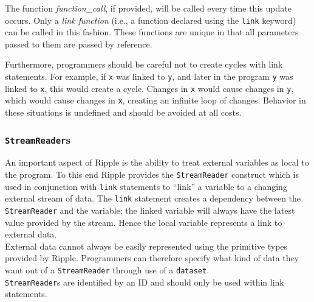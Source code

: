 \documentclass{article}
\newcommand{\code}{\texttt}
\begin{document}
The function \emph{function\_call}, if provided, will be called every time this update occurs. Only a \emph{link function} (i.e., a function declared using the \code{link} keyword) can be called in this fashion. These functions are unique in that all parameters passed to them are passed by reference.

Furthermore, programmers should be careful not to create cycles with link statements. For example, if \code{x} was linked to \code{y}, and later in the program \code{y} was linked to \code{x}, this would create a cycle. Changes in \code{x} would cause changes in \code{y}, which would cause changes in \code{x}, creating an infinite loop of changes. Behavior in these situations is undefined and should be avoided at all costs.

\subsubsection{\code{StreamReader}s}
An important aspect of Ripple is the ability to treat external variables as local to the program. To this end Ripple provides the \code{StreamReader} construct which is used in conjunction with \code{link} statements to ``link'' a variable to a changing external stream of data. The \code{link} statement creates a dependency between the \code{StreamReader} and the variable; the linked variable will always have the latest value provided by the stream. Hence the local variable represents a link to external data.\\
External data cannot always be easily represented using the primitive types provided by Ripple. Programmers can therefore specify what kind of data they want out of a \code{StreamReader} through use of a \code{dataset}.\\
\code{StreamReader}s are identified by an ID and should only be used within link statements. 
\end{document}
